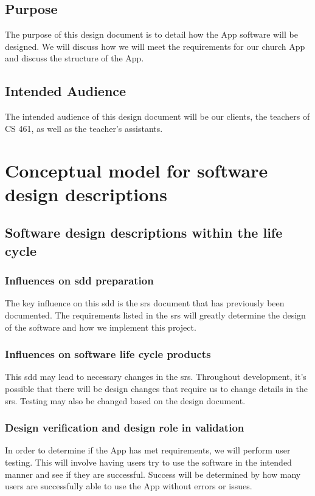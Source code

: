 \documentclass[letterpaper,10pt,draftclsnofoot,onecolumn,titlepage]{IEEEtran}
\begin{document}
		\subsection{Purpose}
			The purpose of this design document is to detail how the \gls{App} software will be designed.
			We will discuss how we will meet the requirements for our church \gls{App} and discuss the structure of the \gls{App}.
		\subsection{Intended Audience}
			The intended audience of this design document will be our clients, the teachers of CS 461, as well as the teacher's assistants.

		\printglossaries


	\section{Conceptual model for software design descriptions}

		\subsection{Software design descriptions within the life cycle}


			\subsubsection{Influences on \gls{sdd} preparation}
				The key influence on this \gls{sdd} is the \gls{srs} document that has previously been documented.
				The requirements listed in the \gls{srs} will greatly determine the design of the software and how we implement this project.

			\subsubsection{Influences on software life cycle products}
				This \gls{sdd} may lead to necessary changes in the \gls{srs}.
				Throughout development, it's possible that there will be design changes that require us to change details in the \gls{srs}.
				Testing may also be changed based on the design document.

			\subsubsection{Design verification and design role in validation}
				In order to determine if the \gls{App} has met requirements, we will perform user testing.
				This will involve having users try to use the software in the intended manner and see if they are successful.
				Success will be determined by how many users are successfully able to use the \gls{App} without errors or issues.
\end{document}
